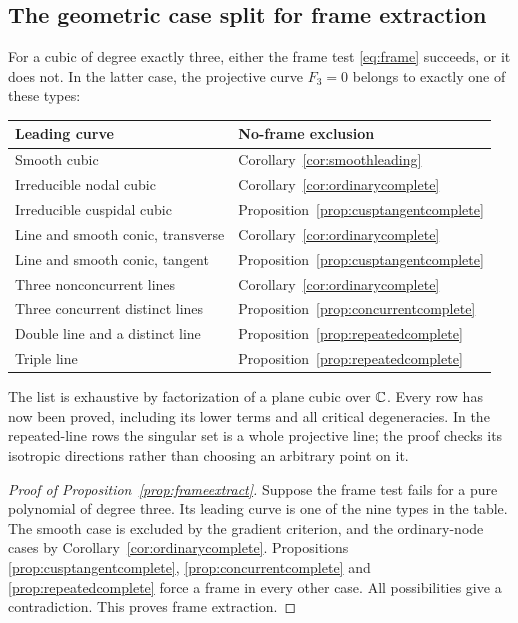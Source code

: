 









\subsection{The geometric case split for frame extraction}

For a cubic of degree exactly three, either the frame test
\eqref{eq:frame} succeeds, or it does not. In the latter case,
the projective curve $F_3=0$ belongs to exactly one of these types:
\begin{center}\small
\begin{tabular}{@{}p{}p{}@{}}
\toprule
Leading curve & No-frame exclusion\\
\midrule
Smooth cubic & Corollary~\ref{cor:smoothleading}\\
Irreducible nodal cubic & Corollary~\ref{cor:ordinarycomplete}\\
Irreducible cuspidal cubic & Proposition~\ref{prop:cusptangentcomplete}\\
Line and smooth conic, transverse & Corollary~\ref{cor:ordinarycomplete}\\
Line and smooth conic, tangent & Proposition~\ref{prop:cusptangentcomplete}\\
Three nonconcurrent lines & Corollary~\ref{cor:ordinarycomplete}\\
Three concurrent distinct lines & Proposition~\ref{prop:concurrentcomplete}\\
Double line and a distinct line & Proposition~\ref{prop:repeatedcomplete}\\
Triple line & Proposition~\ref{prop:repeatedcomplete}\\
\bottomrule
\end{tabular}
\end{center}
The list is exhaustive by factorization of a plane cubic over $\mathbb C$.
Every row has now been proved, including its lower terms and all
critical degeneracies. In the repeated-line rows the singular set
is a whole projective line; the proof checks its isotropic directions
rather than choosing an arbitrary point on it.

\begin{proof}[Proof of Proposition~\ref{prop:frameextract}]
Suppose the frame test fails for a pure polynomial of degree three.
Its leading curve is one of the nine types in the table. The smooth
case is excluded by the gradient criterion, and the ordinary-node
cases by Corollary~\ref{cor:ordinarycomplete}. Propositions
\ref{prop:cusptangentcomplete}, \ref{prop:concurrentcomplete} and
\ref{prop:repeatedcomplete} force a frame in every other case.
All possibilities give a contradiction. This proves frame extraction.
\end{proof}
